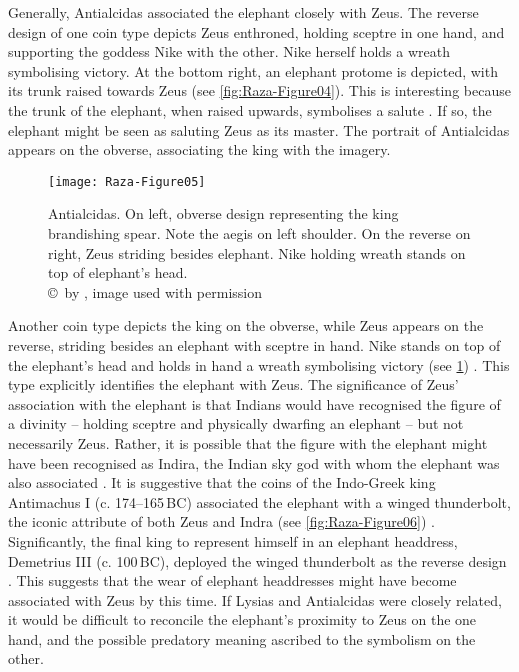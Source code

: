 \documentclass{ijsra}
\renewcommand\BC{{\,BC\xspace}}
\begin{document}
Generally, Antialcidas associated the elephant closely with Zeus. The reverse design of one coin type depicts Zeus enthroned,
holding sceptre in one hand, and supporting the goddess Nike with the other.
Nike herself holds a wreath symbolising victory.
At the bottom right, an elephant protome is depicted, with its trunk raised towards Zeus (see \cref{fig:Raza-Figure04}).
This is interesting because the trunk of the elephant, when raised upwards, symbolises a salute \parencite[33--34]{Whitehead1970}.
If so, the elephant might be seen as saluting Zeus as its master.
The portrait of Antialcidas appears on the obverse, associating the king with the imagery. 

\begin{figure}[!htb] %
	\centering
	\texttt{[image: Raza-Figure05]}
	\caption{Antialcidas. On left, obverse design representing the king brandishing spear. Note the aegis on left shoulder. On the reverse on right, Zeus striding besides elephant. Nike holding wreath stands on top of elephant’s head.
		{\normalfont\scriptsize \\ \copyright\ by \citeauthor{Coin}, image used with permission}}
	\label{fig:Raza-Figure05}
\end{figure}

Another coin type depicts the king on the obverse, while Zeus appears on the reverse, striding besides an elephant with sceptre in hand. 
Nike stands on top of the elephant’s head and holds in hand a wreath symbolising victory (see \cref{fig:Raza-Figure05}) \parencite[27]{Narain1991}. 
This type explicitly identifies the elephant with Zeus. 
The significance of Zeus’ association with the elephant is that Indians would have recognised the figure of a divinity
– holding sceptre and physically dwarfing an elephant – but not necessarily Zeus. 
Rather, it is possible that the figure with the elephant might have been recognised as Indira,
the Indian sky god with whom the elephant was also associated \parencite[247]{MacDowall2007b}. 
It is suggestive that the coins of the Indo-Greek king Antimachus I (c. 174--165\BC) associated the elephant with a winged thunderbolt,
the iconic attribute of both Zeus and Indra (see \cref{fig:Raza-Figure06}) \parencites[242]{MacDowall2007b}[260]{Narain2003}.
Significantly, the final king to represent himself in an elephant headdress, Demetrius III (c. 100\BC),
deployed the winged thunderbolt as the reverse design \parencites[17--18]{Kalita1997}[362]{Sircar2008}.
This suggests that the wear of elephant headdresses might have become associated with Zeus by this time. 
If Lysias and Antialcidas were closely related, it would be difficult to reconcile the elephant’s proximity to Zeus on the one hand,
and the possible predatory meaning ascribed to the symbolism on the other.
\end{document}
